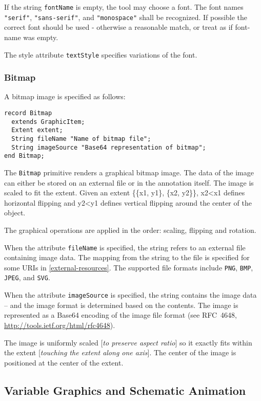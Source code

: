 If the string \lstinline!fontName! is empty, the tool may choose a font. The font
names \lstinline!"serif"!, \lstinline!"sans-serif"!, and \lstinline!"monospace"! shall be recognized. If
possible the correct font should be used - otherwise a reasonable match,
or treat as if font-name was empty.

The style attribute \lstinline!textStyle! specifies variations of the font.

\subsubsection{Bitmap}

A bitmap image is specified as follows:

\begin{lstlisting}[language=modelica]
record Bitmap
  extends GraphicItem;
  Extent extent;
  String fileName "Name of bitmap file";
  String imageSource "Base64 representation of bitmap";
end Bitmap;
\end{lstlisting}
The \lstinline!Bitmap! primitive renders a graphical bitmap image. The data of the
image can either be stored on an external file or in the annotation
itself. The image is scaled to fit the extent. Given an extent \{\{x1,
y1\}, \{x2, y2\}\}, x2\textless{}x1 defines horizontal flipping and
y2\textless{}y1 defines vertical flipping around the center of the
object.

The graphical operations are applied in the order: scaling, flipping and
rotation.

When the attribute \lstinline!fileName! is specified, the string refers to an
external file containing image data. The mapping from the string to the
file is specified for some URIs in \autoref{external-resources}. The supported file
formats include \lstinline!PNG!, \lstinline!BMP!, \lstinline!JPEG!,
and \lstinline!SVG!.

When the attribute \lstinline!imageSource! is specified, the string contains the
image data -- and the image format is determined based on the contents.
The image is represented as a Base64 encoding of the image file format
(see RFC~4648, \url{http://tools.ietf.org/html/rfc4648}).

The image is uniformly scaled {[}\emph{to preserve aspect ratio}{]} so
it exactly fits within the extent {[}\emph{touching the extent along one
axis}{]}. The center of the image is positioned at the center of the
extent.

\subsection{Variable Graphics and Schematic Animation}

